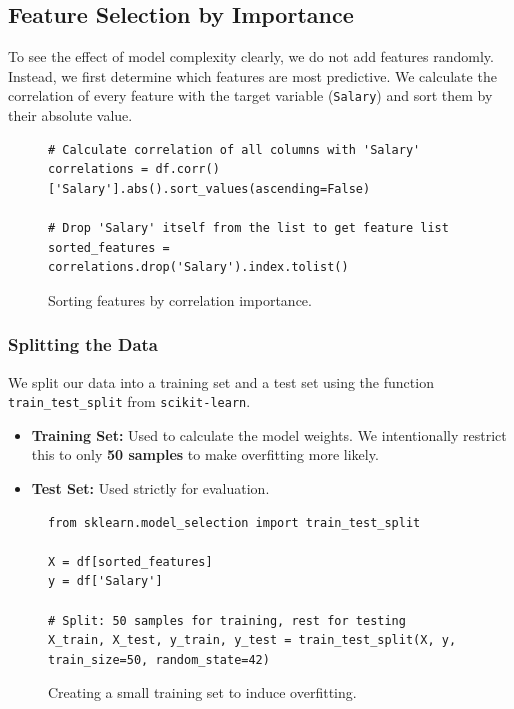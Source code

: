 \subsection{Feature Selection by Importance}
To see the effect of model complexity clearly, we do not add features randomly. Instead, we first determine
which features are most predictive. We calculate the correlation of every feature with the target variable
(\texttt{Salary}) and sort them by their absolute value. 

\begin{figure}[!ht]
\centering
\begin{verbatim}
# Calculate correlation of all columns with 'Salary'
correlations = df.corr()['Salary'].abs().sort_values(ascending=False)

# Drop 'Salary' itself from the list to get feature list
sorted_features = correlations.drop('Salary').index.tolist()
\end{verbatim}
\caption{Sorting features by correlation importance.}
\label{fig:sorting}
\end{figure}

\subsubsection{Splitting the Data}
We split our data into a training set and a test set using the function \texttt{train\_test\_split} from
\texttt{scikit-learn}. 
\begin{itemize}
\item \textbf{Training Set:} Used to calculate the model weights. We intentionally restrict this to only
      \textbf{50 samples} to make overfitting more likely. 
\item \textbf{Test Set:} Used strictly for evaluation.
\end{itemize}

\begin{figure}[!ht]
\centering
\begin{verbatim}
from sklearn.model_selection import train_test_split

X = df[sorted_features]
y = df['Salary']

# Split: 50 samples for training, rest for testing
X_train, X_test, y_train, y_test = train_test_split(X, y, train_size=50, random_state=42)
\end{verbatim}
\caption{Creating a small training set to induce overfitting.}
\label{fig:splitting}
\end{figure}

